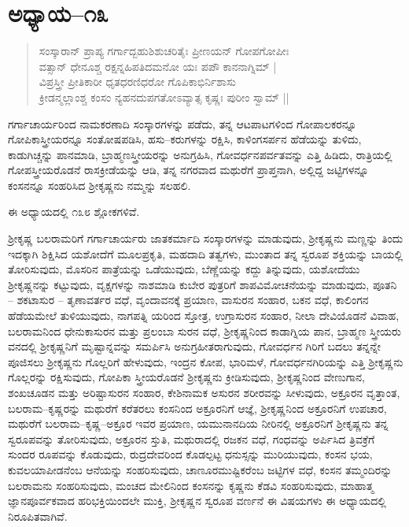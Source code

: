 \section{ಅಧ್ಯಾಯ–೧೩}

\begin{verse}
ಸಂಸ್ಕಾರಾನ್ ಪ್ರಾಪ್ಯ ಗರ್ಗಾದ್ಬಹುಶಿಶುಚರಿತೈಃ ಪ್ರೀಣಯನ್ ಗೋಪಗೋಪೀಃ \\ ವತ್ಸಾನ್ ಧೇನೂಶ್ಚ ರಕ್ಷನ್ನಹಿಪತಿದಮನೋ ಯಃ ಪಪೌ ಕಾನನಾಗ್ನಿಮ್ |\\ ವಿಪ್ರಸ್ತ್ರೀ ಪ್ರೀತಿಕಾರೀ ಧೃತಧರಣಿಧರೋ ಗೊಪಿಕಾಭಿರ್ನಿಶಾಸು \\ ಕ್ರೀಡನ್ಮಲ್ಲಾಂಶ್ಚ ಕಂಸಂ ನ್ಯಹನದುಪಗತೋಽವ್ಯಾತ್ಸ ಕೃಷ್ಣಃ ಪುರೀಂ ಸ್ವಾಮ್ ||
\end{verse}

ಗರ್ಗಾಚಾರ್ಯರಿಂದ ನಾಮಕರಣಾದಿ ಸಂಸ್ಕಾರಗಳನ್ನು ಪಡೆದು, ತನ್ನ ಆಟಪಾಟಗಳಿಂದ ಗೋಪಾಲಕರನ್ನೂ ಗೋಪಿಕಾಸ್ತ್ರೀಯರನ್ನೂ ಸಂತೋಷಪಡಿಸಿ, ಹಸು–ಕರುಗಳನ್ನು ರಕ್ಷಿಸಿ, ಕಾಳಿಂಗಸರ್ಪನ ಹೆಡೆಯನ್ನು ತುಳಿದು, ಕಾಡುಗಿಚ್ಚನ್ನು ಪಾನಮಾಡಿ, ಬ್ರಾಹ್ಮಣಸ್ತ್ರೀಯರನ್ನು ಅನುಗ್ರಹಿಸಿ, ಗೋವರ್ಧನಪರ್ವತವನ್ನು ಎತ್ತಿ ಹಿಡಿದು, ರಾತ್ರಿಯಲ್ಲಿ ಗೋಪಸ್ತ್ರೀಯರೊಡನೆ ರಾಸಕ್ರೀಡೆಯನ್ನು ಆಡಿ, ತನ್ನ ನಗರವಾದ ಮಥುರೆಗೆ ಪ್ರಾಪ್ತನಾಗಿ, ಅಲ್ಲಿದ್ದ ಜಟ್ಟಿಗಳನ್ನೂ ಕಂಸನನ್ನೂ ಸಂಹರಿಸಿದ ಶ‍್ರೀಕೃಷ್ಣನು ನಮ್ಮನ್ನು ಸಲಹಲಿ.

ಈ ಅಧ್ಯಾಯದಲ್ಲಿ ೧೩೮ ಶ್ಲೋಕಗಳಿವೆ.

ಶ‍್ರೀಕೃಷ್ಣ ಬಲರಾಮರಿಗೆ ಗರ್ಗಾಚಾರ್ಯರು ಜಾತಕರ್ಮಾದಿ ಸಂಸ್ಕಾರಗಳನ್ನು ಮಾಡುವುದು, ಶ‍್ರೀಕೃಷ್ಣನು ಮಣ್ಣನ್ನು ತಿಂದು ಇದಕ್ಕಾಗಿ ಶಿಕ್ಷಿಸಿದ ಯಶೋದೆಗೆ ಮೂಲಪ್ರಕೃತಿ, ಮಹದಾದಿ ತತ್ವಗಳು, ಮುಂತಾದ ತನ್ನ ಸ್ವರೂಪ ಶಕ್ತಿಯನ್ನು ಬಾಯಲ್ಲಿ ತೋರಿಸುವುದು, ಮೊಸರಿನ ಪಾತ್ರೆಯನ್ನು ಒಡೆಯುವುದು, ಬೆಣ್ಣೆಯನ್ನು ಕದ್ದು ತಿನ್ನುವುದು, ಯಶೋದೆಯು ಶ‍್ರೀಕೃಷ್ಣನನ್ನು ಕಟ್ಟುವುದು, ವೃಕ್ಷಗಳನ್ನು ನಾಶಮಾಡಿ ಕುಬೇರ ಪುತ್ರರಿಗೆ ಶಾಪವಿಮೋಚನೆಯನ್ನು ಮಾಡುವುದು, ಪೂತನಿ – ಶಕಟಾಸುರ – ತೃಣಾವರ್ತರ ವಧೆ, ವೃಂದಾವನಕ್ಕೆ ಪ್ರಯಾಣ, ವಾಸುರನ ಸಂಹಾರ, ಬಕನ ವಧೆ, ಕಾಲಿಂಗನ ಹೆಡೆಯಮೇಲೆ ತುಳಿಯುವುದು, ನಾಗಪತ್ನಿ ಯರಿಂದ ಸ್ತೋತ್ರ, ಉಗ್ರಾಸುರನ ಸಂಹಾರ, ನೀಲಾ ದೇವಿಯೊಡನೆ ವಿವಾಹ, ಬಲರಾಮನಿಂದ ಧೇನುಕಾಸುರನ ಮತ್ತು ಪ್ರಲಂಬಾ ಸುರನ ವಧೆ, ಶ‍್ರೀಕೃಷ್ಣನಿಂದ ಕಾಡಾಗ್ನಿಯ ಪಾನ, ಬ್ರಾಹ್ಮಣ ಸ್ತ್ರೀಯರು ವನದಲ್ಲಿ ಶ‍್ರೀಕೃಷ್ಣನಿಗೆ ಮೃಷ್ಟಾನ್ನವನ್ನು ಸಮರ್ಪಿಸಿ ಅನುಗ್ರಹೀತರಾಗುವುದು, ಗೋವರ್ಧನ ಗಿರಿಗೆ ಬದಲು ತನ್ನನ್ನೇ ಪೂಜಿಸಲು ಶ‍್ರೀಕೃಷ್ಣನು ಗೊಲ್ಲರಿಗೆ ಹೇಳುವುದು, ಇಂದ್ರನ ಕೋಪ, ಭಾರಿಮಳೆ, ಗೋವರ್ಧನಗಿರಿಯನ್ನು ಎತ್ತಿ ಶ‍್ರೀಕೃಷ್ಣನು ಗೊಲ್ಲರನ್ನು ರಕ್ಷಿಸುವುದು, ಗೋಪಿಕಾ ಸ್ತ್ರೀಯರೊಡನೆ ಶ‍್ರೀಕೃಷ್ಣನು ಕ್ರೀಡಿಸುವುದು, ಶ‍್ರೀಕೃಷ್ಣನಿಂದ ವೇಣುಗಾನ, ಶಂಖಚೂಡನ ಮತ್ತು ಅರಿಷ್ಟಾಸುರನ ಸಂಹಾರ, ಕೇಶಿನಾಮಕ ಅಸುರನ ಶರೀರವನ್ನು ಸೀಳುವುದು, ಅಕ್ರೂರನ ವೃತ್ತಾಂತ, ಬಲರಾಮ–ಕೃಷ್ಣರನ್ನು ಮಥುರೆಗೆ ಕರೆತರಲು ಕಂಸನಿಂದ ಅಕ್ರೂರನಿಗೆ ಆಜ್ಞೆ, ಶ‍್ರೀಕೃಷ್ಣನಿಂದ ಅಕ್ರೂರನಿಗೆ ಉಪಚಾರ, ಮಥುರೆಗೆ ಬಲರಾಮ–ಕೃಷ್ಣ–ಅಕ್ರೂರ ಇವರ ಪ್ರಯಾಣ, ಯಮುನಾನದಿಯ ನೀರಿನಲ್ಲಿ ಅಕ್ರೂರನಿಗೆ ಶ‍್ರೀಕೃಷ್ಣನು ತನ್ನ ಸ್ವರೂಪವನ್ನು ತೋರಿಸುವುದು, ಅಕ್ರೂರನ ಸ್ತುತಿ, ಮಥುರಾದಲ್ಲಿ ರಜಕನ ವಧೆ, ಗಂಧವನ್ನು ಅರ್ಪಿಸಿದ ತ್ರಿವಕ್ರೆಗೆ ಸುಂದರ ರೂಪವನ್ನು ಕೊಡುವುದು, ರುದ್ರದೇವರಿಂದ ಕೊಡಲ್ಪಟ್ಟ ಧನುಸ್ಸನ್ನು ಮುರಿಯುವುದು, ಕಂಸನ ಭಯ, ಕುವಲಯಾಪೀಡನೆಂಬ ಆನೆಯನ್ನು ಸಂಹರಿಸುವುದು, ಚಾಣೂರಮುಷ್ಟಿಕರೆಂಬ ಜಟ್ಟಿಗಳ ವಧೆ, ಕಂಸನ ತಮ್ಮಂದಿರನ್ನು ಬಲರಾಮನು ಸಂಹರಿಸುವುದು, ಮಂಚದ ಮೇಲಿನಿಂದ ಕಂಸನನ್ನು ಕೃಷ್ಣನು ಕೆಡವಿ ಸಂಹರಿಸುವುದು, ಮಾಹಾತ್ಮ ಜ್ಞಾನಪೂರ್ವಕವಾದ ಹರಿಭಕ್ತಿಯಿಂದಲೇ ಮುಕ್ತಿ, ಶ‍್ರೀಕೃಷ್ಣನ ಸ್ವರೂಪ ವರ್ಣನೆ ಈ ವಿಷಯಗಳು ಈ ಅಧ್ಯಾಯದಲ್ಲಿ ನಿರೂಪಿತವಾಗಿವೆ.


